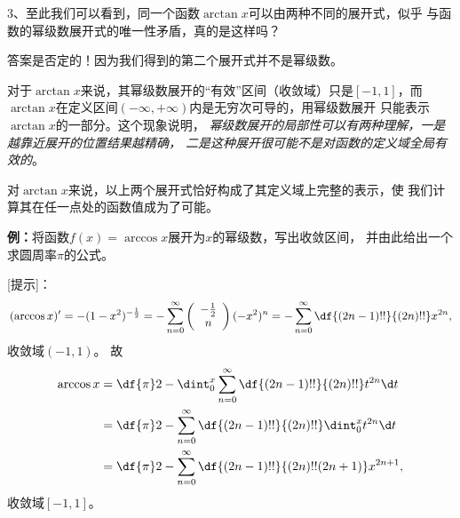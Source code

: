 \begin{shaded}
	\begin{center}
	\end{center}

	3、至此我们可以看到，同一个函数$\arctan x$可以由两种不同的展开式，似乎
	与函数的幂级数展开式的唯一性矛盾，真的是这样吗？

	答案是否定的！因为我们得到的第二个展开式并不是幂级数。

	对于$\arctan x$来说，其幂级数展开的“有效”区间（收敛域）只是$[-1,1]$，而
	$\arctan x$在定义区间$(-\infty,+\infty)$内是无穷次可导的，用幂级数展开
	只能表示$\arctan x$的一部分。这个现象说明，
	{\it 幂级数展开的局部性可以有两种理解，一是越靠近展开的位置结果越精确，
	二是这种展开很可能不是对函数的定义域全局有效的}。

	对$\arctan x$来说，以上两个展开式恰好构成了其定义域上完整的表示，使
	我们计算其在任一点处的函数值成为了可能。
\end{shaded}

{\bf 例：}将函数$f(x)=\arccos x$展开为$x$的幂级数，写出收敛区间，
并由此给出一个求圆周率$\pi$的公式。

[提示]：
$$(\arccos x)'=-(1-x^2)^{-\frac12}
=-\sum\limits_{n=0}^{\infty}
\left(\begin{array}{c} -\frac12 \\ n \end{array}\right)(-x^2)^n
=-\sum\limits_{n=0}^{\infty}\df{(2n-1)!!}{(2n)!!}x^{2n},
$$
收敛域$(-1,1)$。
故
\begin{align*}
	\arccos x
	&=\df{\pi}2
	-\dint_0^x\sum\limits_{n=0}^{\infty}\df{(2n-1)!!}{(2n)!!}t^{2n}\d t\\
	&=\df{\pi}2-\sum\limits_{n=0}^{\infty}\df{(2n-1)!!}{(2n)!!}\dint_0^xt^{2n}\d
	t\\ 
	&=\df{\pi}2-\sum\limits_{n=0}^{\infty}\df{(2n-1)!!}{(2n)!!(2n+1)}x^{2n+1},
\end{align*}
收敛域$[-1,1]$。

